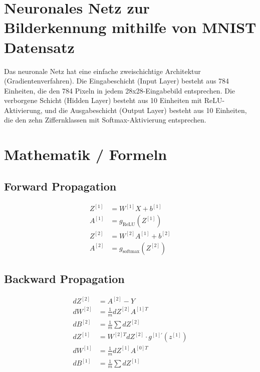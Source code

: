 \documentclass[10pt,a4paper]{article}
\newlength{\sectionparaspace}
\begin{document}

\section*{Neuronales Netz zur Bilderkennung mithilfe von MNIST Datensatz}
\vspace{-\sectionparaspace}
Das neuronale Netz hat eine einfache zweischichtige Architektur (Gradientenverfahren). Die Eingabeschicht (Input Layer) besteht aus 784 Einheiten, die den 784 Pixeln in jedem 28x28-Eingabebild entsprechen. Die verborgene Schicht (Hidden Layer) besteht aus 10 Einheiten mit ReLU-Aktivierung, und die Ausgabeschicht (Output Layer) besteht aus 10 Einheiten, die den zehn Ziffernklassen mit Softmax-Aktivierung entsprechen.
\vspace{-\sectionparaspace}
\section*{Mathematik / Formeln}

\vspace{-\sectionparaspace}

\subsection*{Forward Propagation}
\begin{align*}
Z^{[1]} &= W^{[1]} X + b^{[1]} \\
A^{[1]} &= g_{\text{ReLU}}(Z^{[1]}) \\
Z^{[2]} &= W^{[2]} A^{[1]} + b^{[2]} \\
A^{[2]} &= g_{\text{softmax}}(Z^{[2]})
\end{align*}

\subsection*{Backward Propagation}
\begin{align*}
dZ^{[2]} &= A^{[2]} - Y \\
dW^{[2]} &= \frac{1}{m} dZ^{[2]} A^{[1]T} \\
dB^{[2]} &= \frac{1}{m} \sum dZ^{[2]} \\
dZ^{[1]} &= W^{[2]T} dZ^{[2]} \cdot g^{[1]\prime}(z^{[1]}) \\
dW^{[1]} &= \frac{1}{m} dZ^{[1]} A^{[0]T} \\
dB^{[1]} &= \frac{1}{m} \sum dZ^{[1]}
\end{align*}
\end{document}
